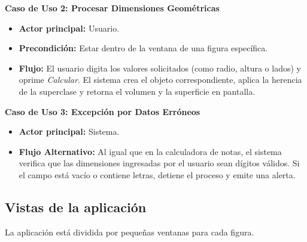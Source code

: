 \documentclass[a4paper,11pt]{article}
\begin{document}
\textbf{Caso de Uso 2: Procesar Dimensiones Geométricas}
\begin{itemize}
    \item \textbf{Actor principal:} Usuario.
    \item \textbf{Precondición:} Estar dentro de la ventana de una figura específica.
    \item \textbf{Flujo:} El usuario digita los valores solicitados (como radio, altura o lados) y oprime \textit{Calcular}. El sistema crea el objeto correspondiente, aplica la herencia de la superclase y retorna el volumen y la superficie en pantalla.
\end{itemize}

\textbf{Caso de Uso 3: Excepción por Datos Erróneos}
\begin{itemize}
    \item \textbf{Actor principal:} Sistema.
    \item \textbf{Flujo Alternativo:} Al igual que en la calculadora de notas, el sistema verifica que las dimensiones ingresadas por el usuario sean dígitos válidos. Si el campo está vacío o contiene letras, detiene el proceso y emite una alerta.
\end{itemize}


\subsection{Vistas de la aplicación}
La aplicación está dividida por pequeñas ventanas para cada figura.
\end{document}
